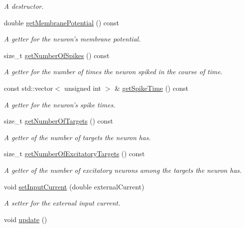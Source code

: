 \begin{DoxyCompactItemize}
\begin{DoxyCompactList}\small\item\em A destructor. \end{DoxyCompactList}\item 
double \hyperlink{classNeuron_a86341dee7a81765fe4840777a008c688}{get\-Membrane\-Potential} () const 
\begin{DoxyCompactList}\small\item\em A getter for the neuron's membrane potential. \end{DoxyCompactList}\item 
size\-\_\-t \hyperlink{classNeuron_a9497c01c1513b480cb96488e104c8b00}{get\-Number\-Of\-Spikes} () const 
\begin{DoxyCompactList}\small\item\em A getter for the number of times the neuron spiked in the course of time. \end{DoxyCompactList}\item 
const std\-::vector$<$ unsigned int $>$ \& \hyperlink{classNeuron_ae87bb09d99e4e9c2185be8b73fc242ba}{get\-Spike\-Time} () const 
\begin{DoxyCompactList}\small\item\em A getter for the neuron's spike times. \end{DoxyCompactList}\item 
size\-\_\-t \hyperlink{classNeuron_a785f2fa8ab4f76dbc6a4b2a18c15da35}{get\-Number\-Of\-Targets} () const 
\begin{DoxyCompactList}\small\item\em A getter of the number of targets the neuron has. \end{DoxyCompactList}\item 
size\-\_\-t \hyperlink{classNeuron_a3c6a80c21ff5172e4de00c7dbf706303}{get\-Number\-Of\-Excitatory\-Targets} () const 
\begin{DoxyCompactList}\small\item\em A getter of the number of excitatory neurons among the targets the neuron has. \end{DoxyCompactList}\item 
void \hyperlink{classNeuron_ae77210c7b0bf3739b01ec2e3dba96827}{set\-Input\-Current} (double external\-Current)
\begin{DoxyCompactList}\small\item\em A setter for the external input current. \end{DoxyCompactList}\item 
void \hyperlink{classNeuron_a782b3b728eee5097ab205a7a7990225b}{update} ()

\end{DoxyCompactItemize}
